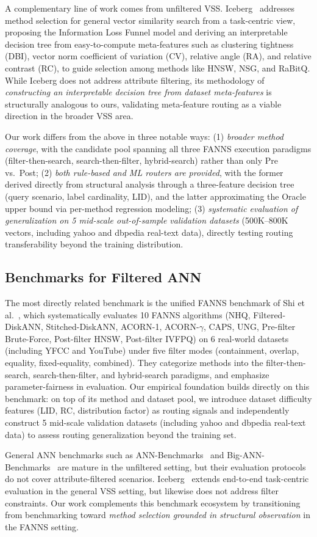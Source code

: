 A complementary line of work comes from unfiltered VSS. Iceberg~\cite{Iceberg} addresses method selection for general vector similarity search from a task-centric view, proposing the Information Loss Funnel model and deriving an interpretable decision tree from easy-to-compute meta-features such as clustering tightness (DBI), vector norm coefficient of variation (CV), relative angle (RA), and relative contrast (RC), to guide selection among methods like HNSW, NSG, and RaBitQ. While Iceberg does not address attribute filtering, its methodology of \emph{constructing an interpretable decision tree from dataset meta-features} is structurally analogous to ours, validating meta-feature routing as a viable direction in the broader VSS area.

Our work differs from the above in three notable ways: (1) \emph{broader method coverage}, with the candidate pool spanning all three FANNS execution paradigms (filter-then-search, search-then-filter, hybrid-search) rather than only Pre vs.\ Post; (2) \emph{both rule-based and ML routers are provided}, with the former derived directly from structural analysis through a three-feature decision tree (query scenario, label cardinality, LID), and the latter approximating the Oracle upper bound via per-method regression modeling; (3) \emph{systematic evaluation of generalization on 5 mid-scale out-of-sample validation datasets} (500K--800K vectors, including yahoo and dbpedia real-text data), directly testing routing transferability beyond the training distribution.

\subsection{Benchmarks for Filtered ANN}
\label{sec:rw-bench}

The most directly related benchmark is the unified FANNS benchmark of Shi et al.~\cite{FilteredANNBenchmark2024}, which systematically evaluates 10 FANNS algorithms (NHQ, Filtered-DiskANN, Stitched-DiskANN, ACORN-1, ACORN-$\gamma$, CAPS, UNG, Pre-filter Brute-Force, Post-filter HNSW, Post-filter IVFPQ) on 6 real-world datasets (including YFCC and YouTube) under five filter modes (containment, overlap, equality, fixed-equality, combined). They categorize methods into the filter-then-search, search-then-filter, and hybrid-search paradigms, and emphasize parameter-fairness in evaluation. Our empirical foundation builds directly on this benchmark: on top of its method and dataset pool, we introduce dataset difficulty features (LID, RC, distribution factor) as routing signals and independently construct 5 mid-scale validation datasets (including yahoo and dbpedia real-text data) to assess routing generalization beyond the training set.

General ANN benchmarks such as ANN-Benchmarks~\cite{ANNBenchmarks2020} and Big-ANN-Benchmarks~\cite{simhadri2022bigann} are mature in the unfiltered setting, but their evaluation protocols do not cover attribute-filtered scenarios. Iceberg~\cite{Iceberg} extends end-to-end task-centric evaluation in the general VSS setting, but likewise does not address filter constraints. Our work complements this benchmark ecosystem by transitioning from benchmarking toward \emph{method selection grounded in structural observation} in the FANNS setting.